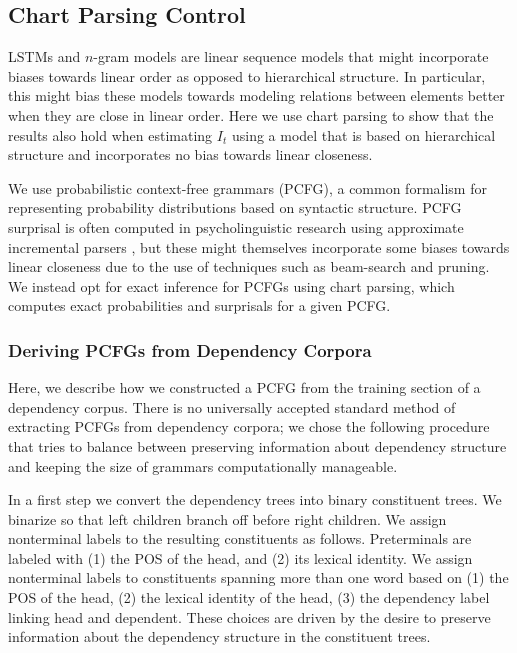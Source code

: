 \documentclass[11pt,letterpaper]{article}
\begin{document}
\subsection{Chart Parsing Control}

LSTMs and $n$-gram models are linear sequence models that might incorporate biases towards linear order as opposed to hierarchical structure.
In particular, this might bias these models towards modeling relations between elements better when they are close in linear order.
Here we use chart parsing to show that the results also hold when estimating $I_t$ using a model that is based on hierarchical structure and incorporates no bias towards linear closeness.

We use probabilistic context-free grammars (PCFG), a common formalism for representing probability distributions based on syntactic structure.
PCFG surprisal is often computed in psycholinguistic research using approximate incremental parsers \citep{DBLP:journals/coling/Roark01,DBLP:journals/coling/DembergKK13,DBLP:journals/topics/SchijndelES13}, but these might themselves incorporate some biases towards linear closeness due to the use of techniques such as beam-search and pruning.
We instead opt for exact inference for PCFGs using chart parsing, which computes exact probabilities and surprisals for a given PCFG.

\subsubsection{Deriving PCFGs from Dependency Corpora}

Here, we describe how we constructed a PCFG from the training section of a dependency corpus.
There is no universally accepted standard method of extracting PCFGs from dependency corpora; we chose the following procedure that tries to balance between preserving information about dependency structure and keeping the size of grammars computationally manageable.

In a first step we convert the dependency trees into binary constituent trees. We binarize so that left children branch off before right children.
We assign nonterminal labels to the resulting constituents as follows.
Preterminals are labeled with (1) the POS of the head, and (2) its lexical identity.
We assign nonterminal labels to constituents spanning more than one word based on (1) the POS of the head, (2) the lexical identity of the head, (3) the dependency label linking head and dependent.
These choices are driven by the desire to preserve information about the dependency structure in the constituent trees.
\end{document}

